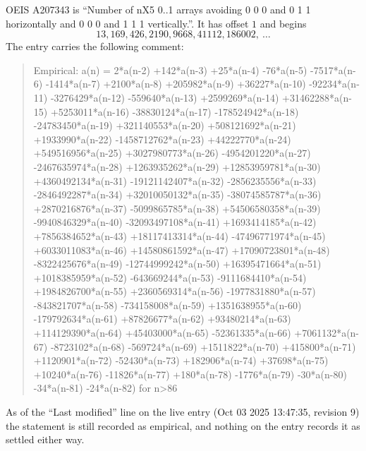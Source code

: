 \documentclass[11pt,a4paper]{article}
\theoremstyle{plain}
\theoremstyle{definition}
\begin{document}
OEIS A207343 is ``Number of nX5 0..1 arrays avoiding 0 0 0 and 0 1 1 horizontally and 0 0 0 and 1 1 1 vertically.''. It has offset
$1$ and begins
\[
13, 169, 426, 2190, 9668, 41112, 186002,\ \dots
\]
The entry carries the following comment:
\begin{quote}\small
Empirical: a(n) = 2*a(n-2) +142*a(n-3) +25*a(n-4) -76*a(n-5) -7517*a(n-6) -1414*a(n-7) +2100*a(n-8) +205982*a(n-9) +36227*a(n-10) -92234*a(n-11) -3276429*a(n-12) -559640*a(n-13) +2599269*a(n-14) +31462288*a(n-15) +5253011*a(n-16) -38830124*a(n-17) -178524942*a(n-18) -24783450*a(n-19) +321140553*a(n-20) +508121692*a(n-21) +1933990*a(n-22) -1458712762*a(n-23) +44222770*a(n-24) +549516956*a(n-25) +3027980773*a(n-26) -4954201220*a(n-27) -2467635974*a(n-28) +1263935262*a(n-29) +12853959781*a(n-30) +4360492134*a(n-31) -19121142407*a(n-32) -2856235556*a(n-33) -2846492287*a(n-34) +32010050132*a(n-35) -38074585787*a(n-36) +2870216876*a(n-37) -5099865785*a(n-38) +54506580358*a(n-39) -9940846329*a(n-40) -32093497108*a(n-41) +1693414185*a(n-42) +7856384652*a(n-43) +18117413314*a(n-44) -47496771974*a(n-45) +6033011083*a(n-46) +14580861592*a(n-47) +17090723801*a(n-48) -8322425676*a(n-49) -12744999242*a(n-50) +16395471664*a(n-51) +1018385959*a(n-52) -643669244*a(n-53) -9111684410*a(n-54) +1984826700*a(n-55) +2360569314*a(n-56) -1977831880*a(n-57) -843821707*a(n-58) -734158008*a(n-59) +1351638955*a(n-60) -179792634*a(n-61) +87826677*a(n-62) +93480214*a(n-63) +114129390*a(n-64) +45403000*a(n-65) -52361335*a(n-66) +7061132*a(n-67) -8723102*a(n-68) -569724*a(n-69) +1511822*a(n-70) +415800*a(n-71) +1120901*a(n-72) -52430*a(n-73) +182906*a(n-74) +37698*a(n-75) +10240*a(n-76) -11826*a(n-77) +180*a(n-78) -1776*a(n-79) -30*a(n-80) -34*a(n-81) -24*a(n-82) for n>86
\end{quote}
As of the ``Last modified'' line on the live entry (Oct 03 2025 13:47:35, revision
9) the statement is still recorded as empirical, and nothing on the entry
records it as settled either way.
\end{document}
